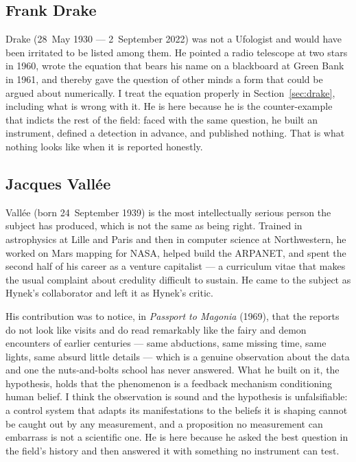 \subsection{Frank Drake}

Drake (28~May 1930 --- 2~September 2022) was not a Ufologist and would have
been irritated to be listed among them. He pointed a radio telescope at two stars in 1960,
wrote the equation that bears his name on a blackboard at Green Bank in 1961, and thereby
gave the question of other minds a form that could be argued about numerically. I treat the
equation properly in Section~\ref{sec:drake}, including what is wrong with it. He is here
because he is the counter-example that indicts the rest of the field: faced with the same
question, he built an instrument, defined a detection in advance, and published nothing.
That is what nothing looks like when it is reported honestly.

\subsection{Jacques Vall\'ee}

Vall\'ee (born 24~September 1939) is the most intellectually serious person the subject has
produced, which is not the same as being right. Trained in astrophysics at Lille and Paris and
then in computer science at Northwestern, he worked on Mars mapping for NASA, helped build the
ARPANET, and spent the second half of his career as a venture capitalist --- a curriculum vitae
that makes the usual complaint about credulity difficult to sustain. He came to the subject as
Hynek's collaborator and left it as Hynek's critic.

His contribution was to notice, in \emph{Passport to Magonia} (1969), that the reports do not
look like visits and do read remarkably like the fairy and demon encounters of earlier centuries
--- same abductions, same missing time, same lights, same absurd little details --- which is a
genuine observation about the data and one the nuts-and-bolts school has never answered. What he
built on it, the  hypothesis, holds that the phenomenon is a feedback
mechanism conditioning human belief. I think the observation is sound and the hypothesis is
unfalsifiable: a control system that adapts its manifestations to the beliefs it is shaping
cannot be caught out by any measurement, and a proposition no measurement can embarrass is not a
scientific one. He is here because he asked the best question in the field's history and then
answered it with something no instrument can test.

